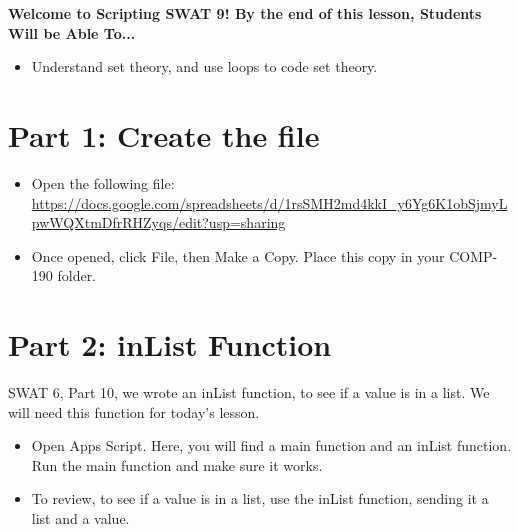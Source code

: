 \documentclass{article}
\newcommand{\AName}{Scripting SWAT 9}
\begin{document}
\textbf{Welcome to \AName!  By the end of this lesson, Students Will be Able To...}
\begin{itemize}
    \item Understand set theory, and use loops to code set theory.
\end{itemize}


\section*{Part 1: Create the file}
\begin{itemize}
    \item Open the following file:  \url{https://docs.google.com/spreadsheets/d/1rsSMH2md4kkI_y6Yg6K1obSjmyLpwWQXtmDfrRHZyqs/edit?usp=sharing}
    \item Once opened, click File, then Make a Copy.  Place this copy in your COMP-190 folder.
\end{itemize}

\section*{Part 2: inList Function}
SWAT 6, Part 10, we wrote an inList function, to see if a value is in a list.  We will need this function for today's lesson.
\begin{itemize}
    \item Open Apps Script.  Here, you will find a main function and an inList function.  Run the main function and make sure it works.  
    \item To review, to see if a value is in a list, use the inList function, sending it a list and a value.
\end{itemize}
\end{document}
